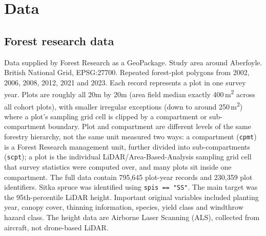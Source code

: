 \documentclass[11pt,a4paper]{report}
\begin{document}
\chapter{Data}
\section{Forest research data}
Data supplied by Forest Research as a GeoPackage.
Study area around Aberfoyle.
British National Grid, EPSG:27700.
Repeated forest-plot polygons from 2002, 2006, 2008, 2012, 2021 and 2023.
Each record represents a plot in one survey year.
Plots are roughly all 20m by 20m (area field median exactly 400\,m\textsuperscript{2} across all cohort plots), with smaller irregular exceptions (down to around 250\,m\textsuperscript{2}) where a plot's sampling grid cell is clipped by a compartment or sub-compartment boundary.
Plot and compartment are different levels of the same forestry hierarchy, not the same unit measured two ways: a compartment (\texttt{cpmt}) is a Forest Research management unit, further divided into sub-compartments (\texttt{scpt}); a plot is the individual LiDAR/Area-Based-Analysis sampling grid cell that survey statistics were computed over, and many plots sit inside one compartment.
The full data contain 795,645 plot-year records and 230,359 plot identifiers.
Sitka spruce was identified using \texttt{spis == "SS"}.
The main target was the 95th-percentile LiDAR height.
Important original variables included planting year, canopy cover, thinning information, species, yield class and windthrow hazard class.
The height data are Airborne Laser Scanning (ALS), collected from aircraft, not drone-based LiDAR.
\end{document}
